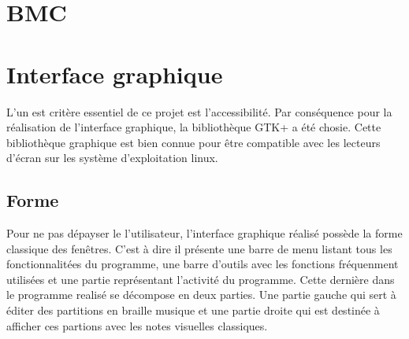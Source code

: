 \section{BMC}

\subsection*{}

\subsection*{}

\subsection*{}



\section{Interface graphique}
L'un est critère essentiel de ce projet est l'accessibilité. Par
conséquence pour la réalisation de l'interface graphique, la
bibliothèque GTK+ a été chosie. Cette bibliothèque graphique est bien
connue pour être compatible avec les lecteurs d'écran sur les système
d'exploitation linux.

\subsection*{Forme}
Pour ne pas dépayser le l'utilisateur, l'interface graphique réalisé
possède la forme classique des fenêtres. C'est à dire il présente une
barre de menu listant tous les fonctionnalitées du programme, une
barre d'outils avec les fonctions fréquenment utilisées et une partie
représentant l'activité du programme.  Cette dernière dans le
programme realisé se décompose en deux parties.  Une partie gauche qui
sert à éditer des partitions en braille musique et une partie droite
qui est destinée à afficher ces partions avec les notes visuelles
classiques.



